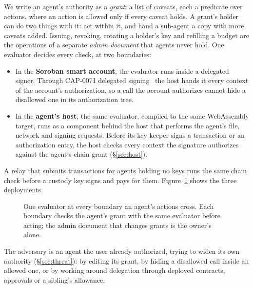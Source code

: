 We write an agent's authority as a \emph{grant}: a list of caveats, each a
predicate over actions, where an action is allowed only if every caveat holds.
A grant's holder can do two things with it: act within it, and hand a sub-agent
a copy with more caveats added. Issuing, revoking, rotating a holder's key and
refilling a budget are the operations of a separate \emph{admin document} that
agents never hold. One evaluator decides every check, at two boundaries:
\begin{itemize}
\item In the \textbf{Soroban smart account}, the evaluator runs inside a
  delegated signer. Through CAP-0071 delegated signing~\cite{cap71,cap7101} the
  host hands it every context of the account's authorization, so a call the
  account authorizes cannot hide a disallowed one in its authorization tree.
\item In the \textbf{agent's host}, the same evaluator, compiled to the same
  WebAssembly target, runs as a component behind the host that performs the
  agent's file, network and signing requests. Before its key keeper signs a
  transaction or an authorization entry, the host checks every context the
  signature authorizes against the agent's chain grant (\S\ref{sec:host}).
\end{itemize}
A relay that submits transactions for agents holding no keys runs the same
chain check before a custody key signs and pays for them. Figure~\ref{fig:arch}
shows the three deployments.

\begin{figure}[t]
\centering
\resizebox{0.8\textwidth}{!}{}
\caption{One evaluator at every boundary an agent's actions cross. Each
boundary checks the agent's grant with the same evaluator before acting; the
admin document that changes grants is the owner's alone.}
\label{fig:arch}
\end{figure}

The adversary is an agent the user already authorized, trying to widen its own
authority (\S\ref{sec:threat}): by editing its grant, by hiding a disallowed
call inside an allowed one, or by working around delegation through deployed
contracts, approvals or a sibling's allowance.

